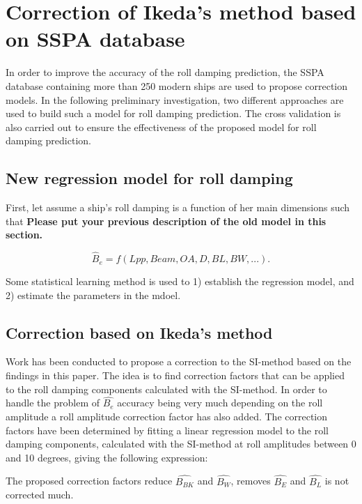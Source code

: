 \section{Correction of Ikeda's method based on SSPA database}
\label{se:correction_SI_method}
In order to improve the accuracy of the roll damping prediction, the SSPA database containing more than 250 modern ships are used to propose correction models. In the following preliminary investigation, two different approaches are used to build such a model for roll damping prediction. The cross validation is also carried out to ensure the effectiveness of the proposed model for roll damping prediction.

\subsection{New regression model for roll damping}
First, let assume a ship's roll damping is a function of her main dimensions such that
\textbf{\color{blue} Please put your previous description of the old model in this section.}

\begin{equation} \label{eq:regression_model}
    \hat{B}_e = f(Lpp, Beam, OA, D, BL, BW, ...).
\end{equation}

Some statistical learning method is used to 1) establish the regression model, and 2) estimate the parameters in the mdoel. 

\subsection{Correction based on Ikeda's method}
Work has been conducted to propose a correction to the SI-method based on the findings in this paper. The idea is to find correction factors that can be applied to the roll damping components calculated with the SI-method. In order to handle the problem of $\hat{B_e}$ accuracy being very much depending on the roll amplitude a roll amplitude correction factor has also added. The correction factors have been determined by fitting a linear regression model to the roll damping components, calculated with the SI-method at roll amplitudes between 0 and 10 degrees, giving the following expression: 

The proposed correction factors reduce $\hat{B_{BK}}$ and $\hat{B_{W}}$, removes $\hat{B_{E}}$ and $\hat{B_{L}}$ is not corrected much.

